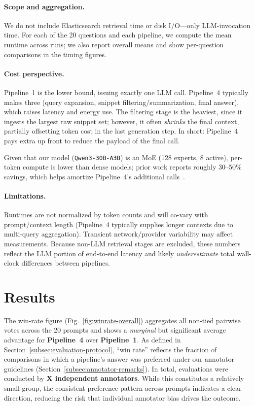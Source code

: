\documentclass[manuscript,screen]{acmart}
\begin{document}
\begin{CCSXML}
	\paragraph{Scope and aggregation.}
	We do not include Elasticsearch retrieval time or disk I/O—only LLM-invocation time. For each
	of the 20 questions and each pipeline, we compute the mean runtime across runs; we also report
	overall means and show per-question comparisons in the timing figures.
	
	\paragraph{Cost perspective.}
	\label{cost-perspective}
	Pipeline~1 is the lower bound, issuing exactly one LLM call. Pipeline~4 typically makes three (query expansion, snippet filtering/summarization, final answer), which raises latency and energy use. The filtering stage is the heaviest, since it ingests the largest raw snippet set; however, it often \emph{shrinks} the final context, partially offsetting token cost in the last generation step. In short: Pipeline~4 pays extra up front to reduce the payload of the final call.
	
	Given that our model (\texttt{Qwen3-30B-A3B}) is an MoE (128 experts, 8 active), per-token compute is lower than dense models; prior work reports roughly 30–50\% savings, which helps amortize Pipeline~4’s additional calls~\cite{qwen3_model,yun2024inferenceoptimalmixtureofexpertlargelanguage}.

	
	\paragraph{Limitations.}
	Runtimes are not normalized by token counts and will co-vary with prompt/context length
	(Pipeline~4 typically supplies longer contexts due to multi-query aggregation). Transient
	network/provider variability may affect measurements. Because non-LLM retrieval stages are
	excluded, these numbers reflect the LLM portion of end-to-end latency and likely
	\emph{underestimate} total wall-clock differences between pipelines.

	
\section{Results}
\label{sec:results}
	
The win-rate figure (Fig.~\ref{fig:winrate-overall}) aggregates all non-tied
pairwise votes across the 20 prompts and shows a \emph{marginal} but significant average
advantage for \textbf{Pipeline~4} over \textbf{Pipeline~1}. As defined in
Section~\ref{subsec:evaluation-protocol}, “win rate” reflects the fraction of
comparisons in which a pipeline’s answer was preferred under our annotator
guidelines (Section~\ref{subsec:annotator-remarks}). In total, evaluations were
conducted by \textbf{X independent annotators}. While this constitutes a relatively
small group, the consistent preference pattern across prompts indicates a clear
direction, reducing the risk that individual annotator bias drives the outcome.



\end{CCSXML}
\end{document}
